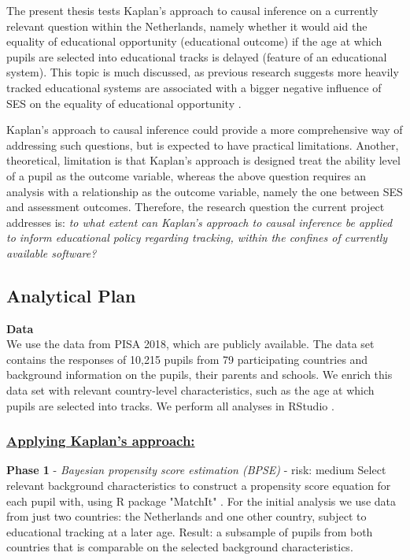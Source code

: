 \documentclass{article}
\begin{document}
The present thesis tests Kaplan's approach to causal inference on a currently relevant question within the Netherlands, namely whether it would aid the equality of educational opportunity (educational outcome) if the age at which pupils are selected into educational tracks is delayed (feature of an educational system). This topic is much discussed, as previous research suggests more heavily tracked educational systems are associated with a bigger negative influence of SES on the equality of educational opportunity \parencite{veldhuis_onderwijscrisis_2021, bol_curricular_2014}.

Kaplan's approach to causal inference could provide a more comprehensive way of addressing such questions, but is expected to have practical limitations. Another, theoretical, limitation is that Kaplan's approach is designed treat the ability level of a pupil as the outcome variable, whereas the above question requires an analysis with a relationship as the outcome variable, namely the one between SES and assessment outcomes. %
Therefore, the research question the current project addresses is: \textit{to what extent can Kaplan's approach to causal inference be applied to inform educational policy regarding tracking, within the confines of currently available software?}

\subsection{Analytical Plan} 
\hspace{\parindent} \textbf{Data} \\
We use the data from PISA 2018, which are publicly available. The data set contains the responses of 10,215 pupils from 79 participating countries and background information on the pupils, their parents and schools. We enrich this data set with relevant country-level characteristics, such as the age at which pupils are selected into tracks. We perform all analyses in RStudio \parencite{RStudio}. 

\subsubsection*{\underline{Applying Kaplan's approach:}}

\hspace{\parindent} \textbf{Phase 1} - \textit{Bayesian propensity score estimation (BPSE)} - risk: medium \newline 
Select relevant background characteristics to construct a propensity score equation for each pupil with, using R package "MatchIt" \parencite{MatchIt}. For the initial analysis we use data from just two countries: the Netherlands and one other country, subject to educational tracking at a later age. Result: a subsample of pupils from both countries that is comparable on the selected background characteristics.\\
\end{document}
